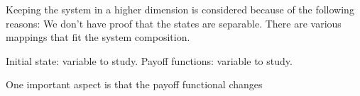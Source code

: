 Keeping the system in a higher dimension is considered because of the following reasons: We don't have proof that the states are separable. There are various mappings that fit the system composition. 


Initial state: variable to study.
Payoff functions: variable to study.

\begin{emph}
One important aspect is that the payoff functional changes
\end{emph}